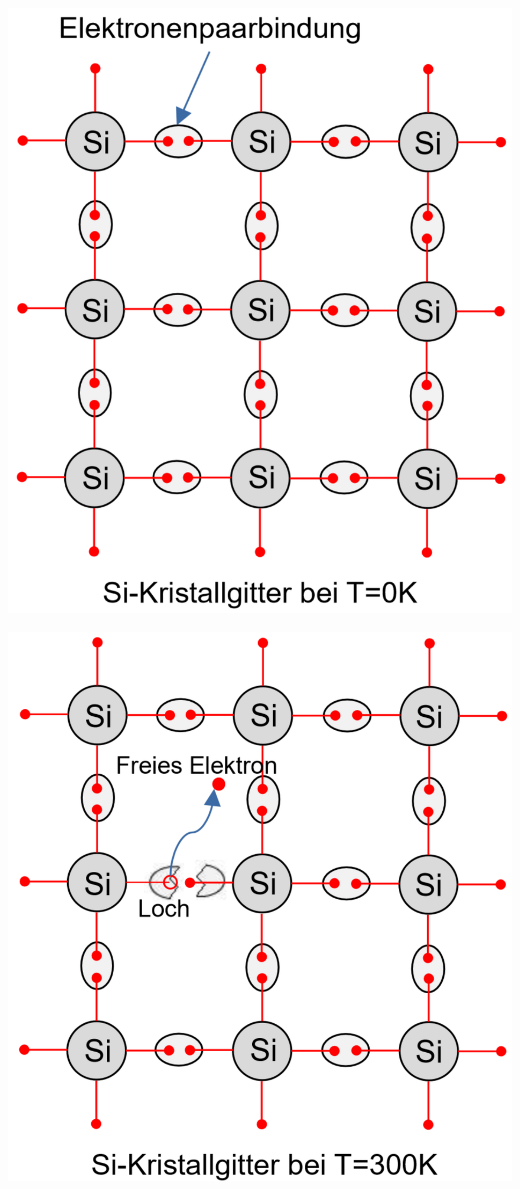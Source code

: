 \begin{minipage}{0.3\linewidth}
    \hspace{2cm}
    \includegraphics[width=0.8\linewidth]{images/RGSiT0K}
\end{minipage}
\hspace{2cm}
\begin{minipage}{0.3\linewidth}
    \includegraphics[width=0.8\linewidth]{images/RGSiT300K} 
\end{minipage}
    
